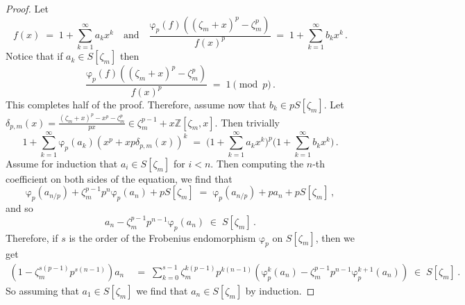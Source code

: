 \documentclass[12pt,reqno]{amsart}
\theoremstyle{definition}
\def\BZ{\mathbb Z}
\def\be{\begin{equation}}
\def\ee{\end{equation}}
\def\z{\zeta}
\def\={\;=\;}
\def\inn{\;\in\;}
\def\fr{\mathrm{\varphi}_p}
\def\Phitof{f}
\begin{document}
\begin{proof}
Let
\be
f(x)\=1+\sum_{k=1}^{\infty}a_{k}x^{k}
\quad\text{and}\quad
\frac{\fr(f)((\z_{m}+x)^{p}-\z_{m}^p)}{f(x)^p}\=1+\sum_{k=1}^{\infty}b_{k}x^{k}\,.
\ee
Notice that if $a_{k}\in S[\z_{m}]$ then
\be
\frac{\fr(f)((\z_{m}+x)^{p}-\z_{m}^p)}{f(x)^p}
\= 1\pmod{p}\,.
\ee
This completes half of the proof. Therefore, assume now that $b_k\in pS[\z_{m}]$. Let
$\delta_{p,m}(x)=\frac{(\z_{m}+x)^{p}-x^p-\z_{m}^p}{px}\in\z_{m}^{p-1}+x\BZ[\z_{m},x]$.
Then trivially
\be
1+\sum_{k=1}^{\infty}\fr(a_{k})(x^{p}+xp\delta_{p,m}(x))^{k}
\=
\Big(1+\sum_{k=1}^{\infty}a_{k}x^{k}\Big)^{p}
\Big(1+\sum_{k=1}^{\infty}b_{k}x^{k}\Big)\,.
\ee
Assume for induction that $a_{i}\in S[\z_{m}]$ for $i<n$. Then computing the $n$-th
coefficient on both sides of the equation, we find that
\be
\fr(a_{n/p})+\z_{m}^{p-1}p^{n}\fr(a_{n})+p S[\z_{m}]
\=
\fr(a_{n/p})+pa_{n}+p S[\z_{m}]\,,
\ee
and so
\be
a_{n}-\z_{m}^{p-1}p^{n-1}\fr(a_{n})\inn S[\z_{m}]\,.
\ee
Therefore, if $s$ is the order of the Frobenius endomorphism $\fr$ on $S[\z_{m}]$,
then we get
\be
\begin{aligned}
(1-\z_{m}^{s(p-1)}p^{s(n-1)})a_{n}
&\=
\sum_{k=0}^{s-1}\z_{m}^{k(p-1)}p^{k(n-1)}(\fr^{k}(a_{n})
-\z_{m}^{p-1}p^{n-1}\fr^{k+1}(a_{n}))
\inn S[\z_{m}]\,.
\end{aligned}
\ee
So assuming that $a_{1}\in S[\z_{m}]$ we find that
$a_{n}\in S[\z_{m}]$ by induction.
\end{proof}
\end{document}
